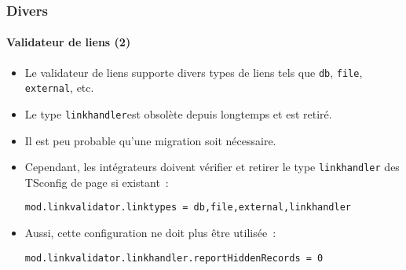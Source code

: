 %

\begin{frame}[fragile]
	\frametitle{Divers}
	\framesubtitle{Validateur de liens (2)}


	\begin{itemize}
		\item Le validateur de liens supporte divers types de liens tels que
			\small\texttt{db}\normalsize, \small\texttt{file}\normalsize,
			\small\texttt{external}\normalsize, etc.
		\item Le type \small\texttt{linkhandler}\normalsize est obsolète depuis longtemps et est retiré.
		\item Il est peu probable qu'une migration soit nécessaire.
		\item Cependant, les intégrateurs doivent vérifier et retirer le type \texttt{linkhandler}
			des TSconfig de page si existant~:
\begin{lstlisting}
mod.linkvalidator.linktypes = db,file,external,linkhandler
\end{lstlisting}

		\item Aussi, cette configuration ne doit plus être utilisée~:
\begin{lstlisting}
mod.linkvalidator.linkhandler.reportHiddenRecords = 0
\end{lstlisting}

	\end{itemize}

\end{frame}

